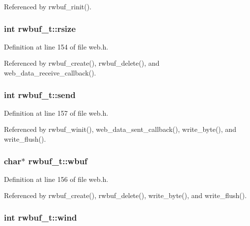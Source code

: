 Referenced by rwbuf\-\_\-rinit().

\hypertarget{structrwbuf__t_aa4094c7e329ae85cc50dbd06d3b50d44}{
\subsubsection[{rsize}]{\setlength{\rightskip}{0pt plus 5cm}int rwbuf\-\_\-t\-::rsize}}\label{structrwbuf__t_aa4094c7e329ae85cc50dbd06d3b50d44}


Definition at line 154 of file web.\-h.



Referenced by rwbuf\-\_\-create(), rwbuf\-\_\-delete(), and web\-\_\-data\-\_\-receive\-\_\-callback().

\hypertarget{structrwbuf__t_a279490994b6576ad00900254a8c07a89}{
\subsubsection[{send}]{\setlength{\rightskip}{0pt plus 5cm}int rwbuf\-\_\-t\-::send}}\label{structrwbuf__t_a279490994b6576ad00900254a8c07a89}


Definition at line 157 of file web.\-h.



Referenced by rwbuf\-\_\-winit(), web\-\_\-data\-\_\-sent\-\_\-callback(), write\-\_\-byte(), and write\-\_\-flush().

\hypertarget{structrwbuf__t_a68386231f3d907ec4508c090925782a2}{
\subsubsection[{wbuf}]{\setlength{\rightskip}{0pt plus 5cm}char$\ast$ rwbuf\-\_\-t\-::wbuf}}\label{structrwbuf__t_a68386231f3d907ec4508c090925782a2}


Definition at line 156 of file web.\-h.



Referenced by rwbuf\-\_\-create(), rwbuf\-\_\-delete(), write\-\_\-byte(), and write\-\_\-flush().

\hypertarget{structrwbuf__t_a135345eee44e93f37e57dbabec12c339}{
\subsubsection[{wind}]{\setlength{\rightskip}{0pt plus 5cm}int rwbuf\-\_\-t\-::wind}}\label{structrwbuf__t_a135345eee44e93f37e57dbabec12c339}


